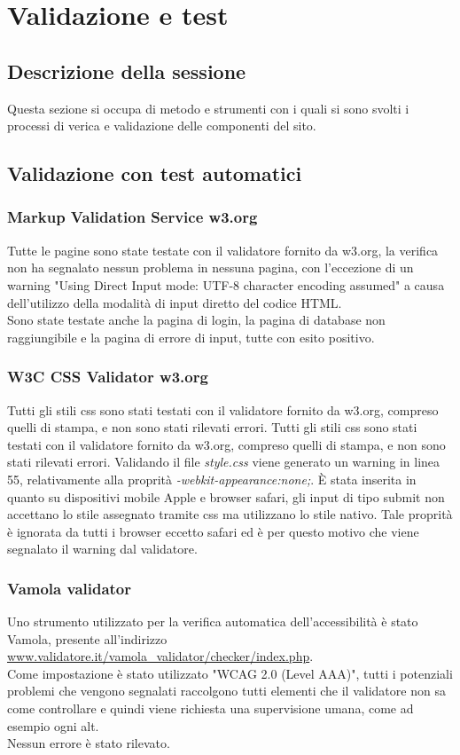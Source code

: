 \documentclass[openany, a4paper, 12pt]{report}
\begin{document}
	\chapter{Validazione e test}
		\section{Descrizione della sessione}
			Questa sezione si occupa di metodo e strumenti con i quali si sono svolti i processi di verica e validazione delle componenti del sito.
		\section{Validazione con test automatici}
			\subsection{Markup Validation Service w3.org}
				Tutte le pagine sono state testate con il validatore fornito da w3.org, la verifica non ha segnalato nessun problema in nessuna pagina, con l'eccezione di un warning "Using Direct Input mode: UTF-8 character encoding assumed" a causa dell'utilizzo della modalità di input diretto del codice HTML.\\
				Sono state testate anche la pagina di login, la pagina di database non raggiungibile e la pagina di errore di input, tutte con esito positivo.
			\subsection{W3C CSS Validator w3.org}
				Tutti gli stili css sono stati testati con il validatore fornito da w3.org, compreso quelli di stampa, e non sono stati rilevati errori.
				Tutti gli stili css sono stati testati con il validatore fornito da w3.org, compreso quelli di stampa, e non sono stati rilevati errori. Validando il file \textit{style.css} viene generato un warning in linea 55, relativamente alla proprità \textit{-webkit-appearance:none;}. È stata inserita in quanto su dispositivi mobile Apple e browser safari, gli input di tipo submit non accettano lo stile assegnato tramite css ma utilizzano lo stile nativo. Tale proprità è ignorata da tutti i browser eccetto safari ed è per questo motivo che viene segnalato il warning dal validatore.
				
				
			\subsection{Vamola validator}
				Uno strumento utilizzato per la verifica automatica dell'accessibilità è stato Vamola, presente all'indirizzo \url{www.validatore.it/vamola_validator/checker/index.php}.\\
				Come impostazione è stato utilizzato "WCAG 2.0 (Level AAA)", tutti i potenziali problemi che vengono segnalati raccolgono tutti elementi che il validatore non sa come controllare e quindi viene richiesta una supervisione umana, come ad esempio ogni alt.\\
				Nessun errore è stato rilevato.
\end{document}
